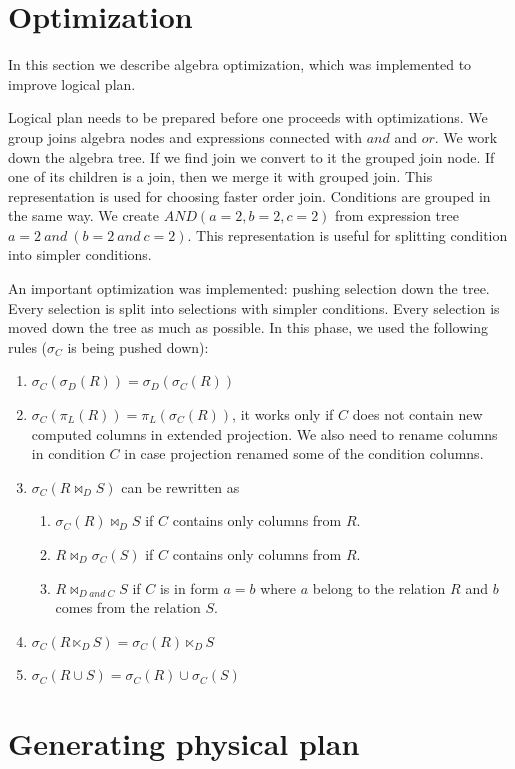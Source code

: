 \section{Optimization}

In this section we describe algebra optimization, which was implemented to improve logical plan.

Logical plan needs to be prepared before one proceeds with optimizations. We group joins algebra nodes and expressions connected with $and$ and $or$. We work down the algebra tree. If we find join we convert to it the grouped join node. If one of its children is a join, then we merge it with grouped join. This representation is used for choosing faster order join. Conditions are grouped in the same way. We create $AND(a=2,b=2,c=2)$ from expression tree $a=2~and~(b=2~and~c=2)$. This representation is useful for splitting condition into simpler conditions.

An important optimization was implemented: pushing selection down the tree. Every selection is split into selections with simpler conditions. Every selection is moved down the tree as much as possible. In this phase, we used the following rules ($\sigma_C$ is being pushed down):
\begin{enumerate}
\item $\sigma_C(\sigma_D(R))=\sigma_D(\sigma_C(R))$
\item $\sigma_C(\pi_L(R))=\pi_L(\sigma_C(R))$, it works only if $C$ does not contain new computed columns in extended projection. We also need to rename columns in condition $C$ in case projection renamed some of the condition columns.
\item  $\sigma_C(R \Join_D S)$ can be rewritten as
\begin{enumerate}
\item $\sigma_C(R) \Join_D S$ if $C$ contains only columns from $R$.
\item $R \Join_D \sigma_C(S)$ if $C$ contains only columns from $R$.
\item $R \Join_{D~and~C} S$ if $C$ is in form $a=b$ where $a$ belong to the relation $R$ and $b$ comes from the relation $S$.
\end{enumerate}
\item $\sigma_C(R \ltimes_D S)=\sigma_C(R)\ltimes_D S$
\item $\sigma_C(R\cup S)=\sigma_C(R)\cup \sigma_C(S)$
\end{enumerate}

\section{Generating physical plan}

